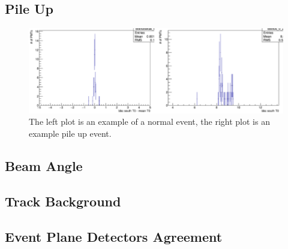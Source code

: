 \subsection{Pile Up}
\begin{figure}[!h]
\begin{center}
\includegraphics[width=0.6\linewidth]{figs/example_pile_up_event.png}
\caption{The left plot is an example of a normal event, the right plot is an example pile up event.}
\end{center}
\end{figure}
\subsection{Beam Angle}
\subsection{Track Background}
\subsection{Event Plane Detectors Agreement}
